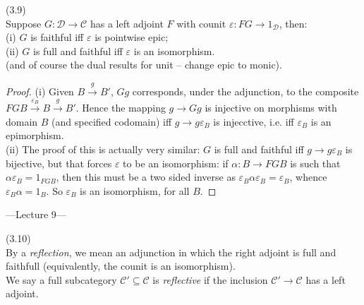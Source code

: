 \documentclass[a4paper]{article}
\begin{document}
\begin{lemma} (3.9)\\
    Suppose $G:\mathcal{D} \to \mathcal{C}$ has a left adjoint $F$ with counit $\varepsilon:FG \to 1_{\mathcal{D}}$, then:\\
    (i) $G$ is faithful iff $\varepsilon$ is pointwise epic;\\
    (ii) $G$ is full and faithful iff $\varepsilon$ is an isomorphism.\\
    (and of course the dual results for unit -- change epic to monic).\\
    \begin{proof}
        (i) Given $B \xrightarrow{g} B'$, $Gg$ corresponds, under the adjunction, to the composite $FGB \xrightarrow{\varepsilon_B} B \xrightarrow{g} B'$. Hence the mapping $g \to Gg$ is injective on morphisms with domain $B$ (and specified codomain) iff $g \to g\varepsilon_B$ is injecctive, i.e. iff $\varepsilon_B$ is an epimorphism.\\
        (ii) The proof of this is actually very similar: $G$ is full and faithful iff $g \to g\varepsilon_B$ is bijective, but that forces $\varepsilon$ to be an isomorphism: if $\alpha:B \to FGB$ is such that $\alpha\varepsilon_B = 1_{FGB}$, then this must be a two sided inverse as $\varepsilon_B \alpha \varepsilon_B = \varepsilon_B$, whence $\varepsilon_B \alpha = 1_B$. So $\varepsilon_B$ is an isomorphism, for all $B$.
    \end{proof}
\end{lemma}

---Lecture 9---

\begin{defi} (3.10)\\
    By a \emph{reflection}, we mean an adjunction in which the right adjoint is full and faithfull (equivalently, the counit is an isomorphism).\\
    We say a full subcategory $\mathcal{C}' \subseteq \mathcal{C}$ is \emph{reflective} if the inclusion $\mathcal{C}'\to\mathcal{C}$ has a left adjoint.
\end{defi}
\end{document}
